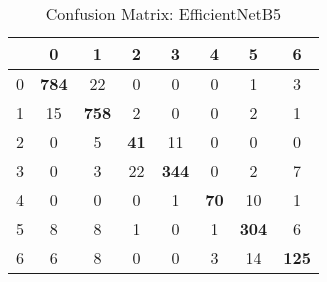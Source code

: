 \begin{table}
    \centering
    \begin{tabular}{c|c c c c c c c}
         & 0 & 1 & 2 & 3 & 4 & 5 & 6 \\
         \hline
         0 &\textbf{784} &22 &0 &0  &0 &1 & 3 \\
         1 &15 &\textbf{758} &2 &0  &0 &2 & 1 \\
         2 &0 &5 &\textbf{41} &11  &0 &0 & 0 \\
         3 &0 &3 &22 &\textbf{344}  &0 &2 & 7 \\
         4 &0 &0 &0 &1  &\textbf{70} &10 & 1 \\
         5 &8 &8 &1 &0  &1 &\textbf{304} & 6 \\
         6 &6 &8 &0 &0  &3 &14 & \textbf{125} \\
    \end{tabular}
    \caption{Confusion Matrix: EfficientNetB5}
    \label{tab:CF B5}
\end{table}